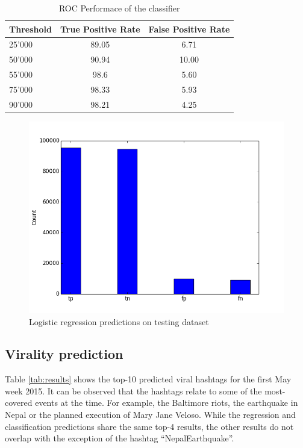 \begin{table}[h]
\centering
\begin{tabular}{ l | c |c |}
\textbf{Threshold} & \textbf{True Positive Rate} &
\textbf{False Positive Rate}  \\\hline
25'000  &  89.05  & 6.71  \\
50'000  &  90.94  & 10.00  \\
55'000  &  98.6   & 5.60  \\ 
75'000  &  98.33  & 5.93  \\ 
90'000  &  98.21  & 4.25
\end{tabular}
\caption{ROC Performace of the classifier}
\label{tab:roc}
\end{table}


\begin{figure}[H]
\centering
\includegraphics[width=0.6\linewidth]{img/performanceLR.png}
\caption{Logistic regression predictions on testing dataset}
\label{fig:resultsLR}
\end{figure}

\subsection{Virality prediction}
\label{sec:viral}
Table \ref{tab:results} shows the top-10 predicted viral hashtags for the first May week 2015. It can be observed that the hashtags relate to some of the most-covered events at the time. For example, the Baltimore riots, the earthquake in Nepal or the planned execution of Mary Jane Veloso. While the regression and classification predictions share the same top-4 results, the other results do not overlap with the exception of the hashtag ``NepalEarthquake''. 


